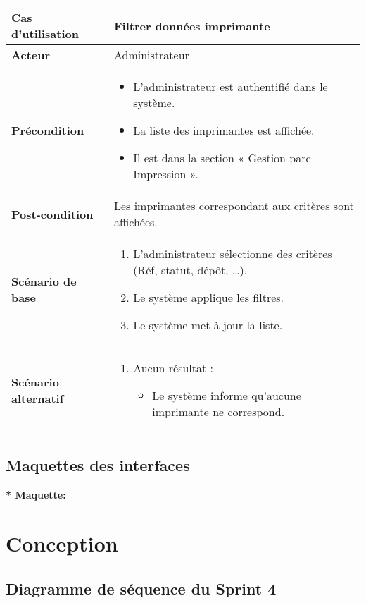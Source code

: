 \documentclass[a4paper,11pt]{report}
\begin{document}
\begin{tabularx}{\textwidth}{|>{\bfseries}l|X|}
\hline
Cas d’utilisation    & Filtrer données imprimante \\
\hline
Acteur               & Administrateur \\
\hline
Précondition         &
\begin{itemize}[left=0pt]
  \item L’administrateur est authentifié dans le système.
  \item La liste des imprimantes est affichée.
  \item Il est dans la section « Gestion parc Impression ».
\end{itemize} \\
\hline
Post-condition       & Les imprimantes correspondant aux critères sont affichées. \\
\hline
Scénario de base     &
\begin{enumerate}[left=0pt]
  \item L’administrateur sélectionne des critères (Réf, statut, dépôt, …).
  \item Le système applique les filtres.
  \item Le système met à jour la liste.
\end{enumerate} \\
\hline
Scénario alternatif   &
\begin{enumerate}[label=\arabic*.a,wide=0pt]
  \item Aucun résultat :
    \begin{itemize}[left=1em]
      \item Le système informe qu’aucune imprimante ne correspond.
    \end{itemize}
\end{enumerate} \\
\hline
\end{tabularx}

\subsection{Maquettes des interfaces}
\textbf{* Maquette: }




\section{Conception}
\subsection{Diagramme de séquence du Sprint 4}
\end{document}
